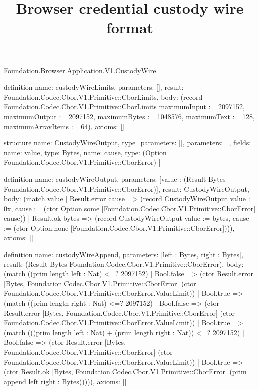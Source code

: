 \begin{lexlean}{Foundation.Browser.Application.V1.CustodyWire}
\title{Browser credential custody wire format}
\begin{semanticmodule}
definition{
  name: custodyWireLimits,
  parameters: [],
  result: Foundation.Codec.Cbor.V1.Primitive::CborLimits,
  body: (record Foundation.Codec.Cbor.V1.Primitive::CborLimits {maximumInput := 2097152, maximumOutput := 2097152, maximumBytes := 1048576, maximumText := 128, maximumArrayItems := 64}),
  axioms: []
}

structure{
  name: CustodyWireOutput,
  type_parameters: [],
  parameters: [],
  fields: [
    {name: value, type: Bytes},
    {name: cause, type: (Option Foundation.Codec.Cbor.V1.Primitive::CborError)}
  ]
}

definition{
  name: custodyWireOutput,
  parameters: [value : (Result Bytes Foundation.Codec.Cbor.V1.Primitive::CborError)],
  result: CustodyWireOutput,
  body: (match value
    | Result.error cause => (record CustodyWireOutput {value := 0x, cause := (ctor Option.some [Foundation.Codec.Cbor.V1.Primitive::CborError] cause)})
    | Result.ok bytes => (record CustodyWireOutput {value := bytes, cause := (ctor Option.none [Foundation.Codec.Cbor.V1.Primitive::CborError])})),
  axioms: []
}

definition{
  name: custodyWireAppend,
  parameters: [left : Bytes, right : Bytes],
  result: (Result Bytes Foundation.Codec.Cbor.V1.Primitive::CborError),
  body: (match ((prim length left : Nat) <=? 2097152)
    | Bool.false => (ctor Result.error [Bytes, Foundation.Codec.Cbor.V1.Primitive::CborError] (ctor Foundation.Codec.Cbor.V1.Primitive::CborError.ValueLimit))
    | Bool.true => (match ((prim length right : Nat) <=? 2097152)
      | Bool.false => (ctor Result.error [Bytes, Foundation.Codec.Cbor.V1.Primitive::CborError] (ctor Foundation.Codec.Cbor.V1.Primitive::CborError.ValueLimit))
      | Bool.true => (match (((prim length left : Nat) + (prim length right : Nat)) <=? 2097152)
        | Bool.false => (ctor Result.error [Bytes, Foundation.Codec.Cbor.V1.Primitive::CborError] (ctor Foundation.Codec.Cbor.V1.Primitive::CborError.ValueLimit))
        | Bool.true => (ctor Result.ok [Bytes, Foundation.Codec.Cbor.V1.Primitive::CborError] (prim append left right : Bytes))))),
  axioms: []
}


\end{semanticmodule}
\end{lexlean}
